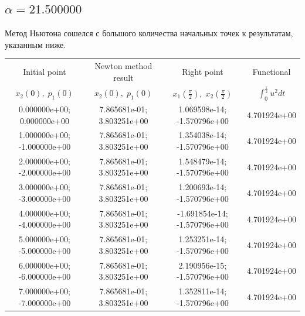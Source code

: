 \documentclass[titlepage]{article}
\def\l{\left}
\def\r{\right}
\begin{document}
\subsection{$\alpha = 21.500000$} 
Метод Ньютона сошелся с большого количества начальных точек к результатам, указанным ниже. \\ 
\begin{tabular}{ | c | c | c | c |} 
\hline 
Initial point  & Newton method result & Right point & Functional 
 \\ $x_2(0), \; p_1(0)$ & $x_2(0), \; p_1(0)$ & $x_1\l(\frac{\pi}{2}\r), \; x_2\l(\frac{\pi}{2}\r)$ & $\int_{0}^{\frac{\pi}{2}}u^2dt$  \\ \hline 
0.000000e+00; 0.000000e+00 & 7.865681e-01; 3.803251e+00 & 1.069598e-14; -1.570796e+00 & 4.701924e+00 \\ \hline 
1.000000e+00; -1.000000e+00 & 7.865681e-01; 3.803251e+00 & 1.354038e-14; -1.570796e+00 & 4.701924e+00 \\ \hline 
2.000000e+00; -2.000000e+00 & 7.865681e-01; 3.803251e+00 & 1.548479e-14; -1.570796e+00 & 4.701924e+00 \\ \hline 
3.000000e+00; -3.000000e+00 & 7.865681e-01; 3.803251e+00 & 1.200693e-14; -1.570796e+00 & 4.701924e+00 \\ \hline 
4.000000e+00; -4.000000e+00 & 7.865681e-01; 3.803251e+00 & -1.691854e-14; -1.570796e+00 & 4.701924e+00 \\ \hline 
5.000000e+00; -5.000000e+00 & 7.865681e-01; 3.803251e+00 & 1.253251e-14; -1.570796e+00 & 4.701924e+00 \\ \hline 
6.000000e+00; -6.000000e+00 & 7.865681e-01; 3.803251e+00 & 2.190956e-15; -1.570796e+00 & 4.701924e+00 \\ \hline 
7.000000e+00; -7.000000e+00 & 7.865681e-01; 3.803251e+00 & 1.352811e-14; -1.570796e+00 & 4.701924e+00 \\ \hline 
\end{tabular} 
\end{document}
